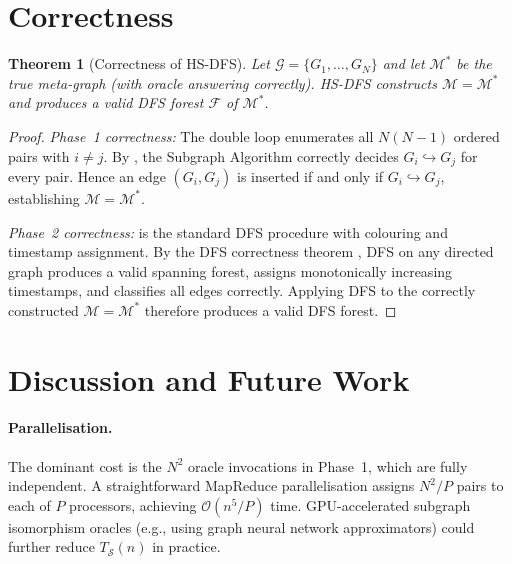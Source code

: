 ﻿\documentclass[12pt,a4paper]{article}
\theoremstyle{plain}
\newtheorem{theorem}{Theorem}[section]
\theoremstyle{definition}
\theoremstyle{remark}
\begin{document}
	\section{Correctness}
	\label{sec:correctness}
	
	\begin{theorem}[Correctness of HS-DFS]
		\label{thm:correct}
		Let $\mathcal{G} = \{G_1, \ldots, G_N\}$ and let $\mathcal{M}^*$ be the
		true meta-graph (with oracle answering correctly).  HS-DFS constructs
		$\mathcal{M} = \mathcal{M}^*$ and produces a valid DFS forest
		$\mathcal{F}$ of $\mathcal{M}^*$.
	\end{theorem}
	
	\begin{proof}
		\textit{Phase~1 correctness:} The double loop enumerates all $N(N-1)$
		ordered pairs with $i \neq j$.  By , the
		Subgraph Algorithm correctly decides $G_i \hookrightarrow G_j$ for every
		pair.  Hence an edge $(G_i, G_j)$ is inserted if and only if
		$G_i \hookrightarrow G_j$, establishing $\mathcal{M} = \mathcal{M}^*$.
		
		\textit{Phase~2 correctness:}  is the standard DFS
		procedure with colouring and timestamp assignment.  By the DFS correctness
		theorem \cite[Theorem 22.2]{cormen2009}, DFS on any directed graph produces
		a valid spanning forest, assigns monotonically increasing timestamps, and
		classifies all edges correctly.  Applying DFS to the correctly constructed
		$\mathcal{M} = \mathcal{M}^*$ therefore produces a valid DFS forest.
	\end{proof}
	
	\section{Discussion and Future Work}
	\label{sec:discussion}
	
	\paragraph{Parallelisation.}
	The dominant cost is the $N^2$ oracle invocations in Phase~1, which are
	fully independent.  A straightforward MapReduce parallelisation assigns
	$N^2 / P$ pairs to each of $P$ processors, achieving
	$\mathcal{O}(n^5 / P)$ time.  GPU-accelerated subgraph isomorphism oracles
	(e.g., using graph neural network approximators) could further reduce
	$T_{\mathcal{S}}(n)$ in practice.
	
\end{document}
